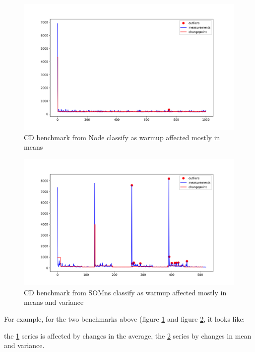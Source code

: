 \documentclass{article}
\begin{document}
\begin{figure}[h!]
    \centering
    \includegraphics[width=1\textwidth]{images/plot_6_flat.png}
    \caption{CD benchmark from Node classify as warmup affected mostly in means}
    \label{fig:bench_node_flat}
\end{figure}



\begin{figure}[h!]
    \centering
    \includegraphics[width=1\textwidth]{images/plot_10_flat.png}
    \caption{CD benchmark from SOMns classify as warmup affected mostly in means and variance}
    \label{fig:bench_somns_flat}
\end{figure}

For example, for the two benchmarks above (figure \ref{fig:bench_node_flat} and figure \ref{fig:bench_somns_flat}, it looks like:

the \ref{fig:bench_node_flat} series is affected by changes in the average,
the \ref{fig:bench_somns_flat} series by changes in mean and variance.
\end{document}
